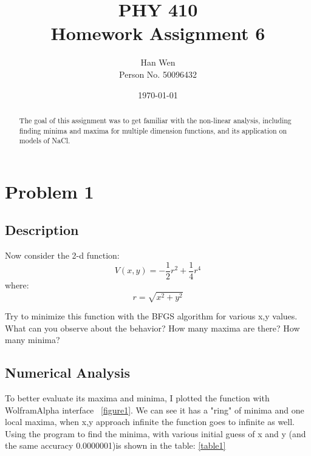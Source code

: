 \documentclass[11pt,letterpaper]{article}
\begin{document}
\title{PHY 410 \\ Homework Assignment 6}
\author{Han Wen \\ \tiny Person No. 50096432}
\date{\today}

\maketitle

\begin{abstract}
The goal of this assignment was to get familiar with the non-linear analysis, including finding minima and maxima for multiple dimension functions, and its application on models of NaCl.


\end{abstract}

\tableofcontents

\newpage
\section{Problem 1}

\subsection{Description}

Now consider the 2-d function:
$$
V(x,y)=-\frac{1}{2}r^2+\frac{1}{4}r^4
$$
where:
$$
r=\sqrt{x^2+y^2}
$$

Try to minimize this function with the BFGS algorithm for various x,y values. What can you observe about the behavior? How many maxima are there? How many minima? 

\subsection{Numerical Analysis}

To better evaluate its maxima and minima, I plotted the function with WolframAlpha interface \cite{plot of 2d function} ~\ref{figure1}. We can see it has a "ring" of minima and one local maxima, when x,y approach infinite the function goes to infinite as well.
Using the program to find the minima, with various initial guess of x and y (and the same accuracy 0.0000001)is shown in the table: \ref{table1}
\end{document}
